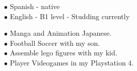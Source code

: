 \documentclass[9pt]{developercv} %
\begin{document}

\begin{minipage}[t]{0.4\textwidth}	
	\vspace{-\baselineskip} %

	$\bullet$ {Spanish} - native\\
	$\bullet$ {English} - B1 level - Studding currently\\


	\vspace{-\baselineskip} %

		$\bullet$ Manga and Animation Japanese.\\
		$\bullet$ Football Soccer with my son.\\  
		$\bullet$ Assemble lego figures with my kid.\\ 
		$\bullet$ Player Videogames in my Playstation 4.

\end{minipage}

\end{document}
